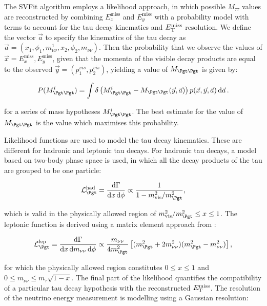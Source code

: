 The SVFit algorithm employs a likelihood approach, in which possible
$M_{\tau\tau}$ values are reconstructed by combining $E_{x}^{\text{miss}}$ and
$E_{y}^{\text{miss}}$ with a probability model with terms to account for the tau
decay kinematics and $E_{\mathrm{T}}^{\text{miss}}$ resolution. We define the vector $\vec{a}$ to
specify the kinematics of the tau decay as $\vec{a} =
\left(x_{1},\phi_{1},m_{\nu\nu}^{1},x_{2},\phi_{2},m_{\nu\nu}\right)$. Then the
probability that we observe the values of $\vec{x} = E_{x}^{\text{miss}},
E_{y}^{\text{miss}}$, given that the momenta of the visible decay products are
equal to the observed $\vec{y} = \left(p_{1}^{vis},p_{2}^{vis} \right)$,
yielding a value of $M_{\Pgt\Pgt}$ is given by: 

\begin{equation} \label{eqn:svfit-prob}
P(M_{\Pgt\Pgt}^{i}) = \int\delta\left(M_{\Pgt\Pgt}^{i} -
M_{\Pgt\Pgt}(\vec{y},\vec{a})\right)p(\vec{x},\vec{y},\vec{a})\,\text{d}\vec{a}\,
.
\end{equation}

for a series of mass hypotheses $M_{\Pgt\Pgt}^{i}$. The best estimate for the
value of $M_{\Pgt\Pgt}$ is the value which maximises this probability. 

Likelihood functions are used to model the tau decay kinematics. These are
different for hadronic and leptonic tau decays. For hadronic tau decays, a model
based on two-body phase space is used, in which all the decay products of the
tau are grouped to be one particle:

\begin{equation}
\mathcal{L}_{\Pgt}^{\text{had}} = \frac{\text{d}\Gamma}{\text{d}x\,\text{d}\phi}
\propto \frac{1}{1 - m_{\text{vis}}^{2} / m_{\Pgt}^{2}},
\end{equation}

which is valid in the physically allowed region of $m_{\text{vis}}^{2} /
m_{\Pgt}^{2} \leq x \leq 1$. The leptonic function is derived using a matrix
element approach from \cite{TauPol}:

\begin{equation}
\mathcal{L}_{\Pgt}^{\text{lep}} =
\frac{\text{d}\Gamma}{\text{d}x\,\text{d}m_{\nu\nu}\,\text{d}\phi} \propto
\frac{m_{\nu\nu}}{4m_{\Pgt}^{2}}\left[(m_{\Pgt}^{2}+2m_{\nu\nu}^{2})(m_{\Pgt}^{2}-m_{\nu\nu}^{2})\right],
\end{equation}

for which the physically allowed region constitutes $0 \leq x \leq 1$ and $0
\leq m_{\nu\nu} \leq m_{\tau}\sqrt{1-x}$. The final part of the likelihood
quantifies the compatibility of a particular tau decay hypothesis with the
reconstructed $E_{\mathrm{T}}^{\text{miss}}$. The resolution of the neutrino energy measurement is
modelling using a Gaussian resolution:

